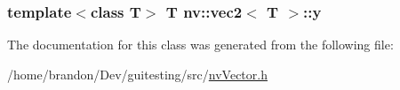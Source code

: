 \hypertarget{classnv_1_1vec2_e4021bd7f878caa55ecc0727b28a2632}{
\subsubsection[{y}]{\setlength{\rightskip}{0pt plus 5cm}template$<$class T$>$ T {\bf nv::vec2}$<$ T $>$::{\bf y}}}
\label{classnv_1_1vec2_e4021bd7f878caa55ecc0727b28a2632}




The documentation for this class was generated from the following file:\begin{CompactItemize}
\item 
/home/brandon/Dev/guitesting/src/\hyperlink{nv_vector_8h}{nvVector.h}\end{CompactItemize}
